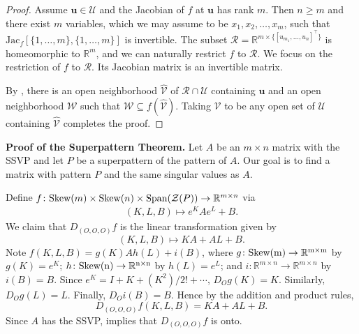 \documentclass[preprint,12pt]{elsarticle}
\newcommand{\trans  }{^\top}
\newcommand{\skw}{\rm Skew}
\newcommand{\mat}{\mathbb{R}}
\begin{document}
\begin{proof}
Assume $\mathbf u \in \mathcal{U}$ and the  Jacobian of 
 $f$ at $\mathbf u$ has rank $m$.
Then $n\geq m$ and  there exist $m$ variables, 
which we may assume  to be  $x_1, x_2, \ldots, x_m$, 
such that $\mbox{Jac}_f[\{1,\ldots, m\}, \{1,\ldots, m\}]$ is invertible.
The subset $\mathcal{R}=\mathbb{R}^{m \times \{[u_{m_1}, \ldots, u_{n}]\trans\}}$ is homeomorphic 
to $\mathbb{R}^m$, and we can naturally restrict $f$ to $\mathcal{R}$.
We focus on  the restriction of $f$ to $\mathcal{R}$. 
Its Jacobian matrix is an invertible matrix. 

By , there is an open neighborhood $\hat{\mathcal{V}}$ of $\mathcal{R}\cap \mathcal{U}$
containing $\mathbf u$
and an open neighborhood $\mathcal{W}$  such that $\mathcal{W} \subseteq f(\hat{\mathcal{V}})$. 
Taking   $\mathcal{V}$ to be any open set of $\mathcal{U}$ containing $\hat{\mathcal{V}}$ completes the proof. 
\end{proof}


\bigskip\noindent
{\bf Proof of the Superpattern Theorem.}
Let $A$ be an $m\times n$ matrix with the SSVP and let $P$ be a superpattern of the pattern of $A$. Our goal is to find a matrix with pattern $P$ and the same singular values as $A$.  

Define $f\colon \mbox{\skw}(m)\times \mbox{\skw}(n)\times  \mbox{Span} (\mathcal{Z}(P)) \to \mat^{m\times n}$ via
\begin{align*}
    (K,L,B) \mapsto e^{K}Ae^{L} + B.
\end{align*}
We claim that 
$D_{(O,O,O)}f$ is the linear transformation given by 
\[ 
(K,L,B) \mapsto KA + AL + B. 
\]
Note $f(K,L,B)=g(K)Ah(L) +i(B)$,
where $g\colon \skw(m)\rightarrow \mat^{m\times m}$ by  $g(K)=e^K$;
$h\colon \skw(n)\rightarrow \mat^{n\times n}$ by  $h(L)=e^L$;
and $i\colon \mat^{m\times n} \rightarrow \mat^{m\times n}$ by $i(B)=B$.
Since $e^K= I +K + (K^2)/2! + \cdots $,  $D_{O}g(K)=K$.
Similarly, $D_{O}g(L)=L$. Finally, $D_{O}i(B)=B$. 
Hence by the addition and product rules,  
\[ D_{(O,O,O)}f(K,L,B)=
KA +AL +B.\] 
Since $A$ has the SSVP,   implies that $D_{(O,O,O)}f$ is onto. 

 
\end{document}
